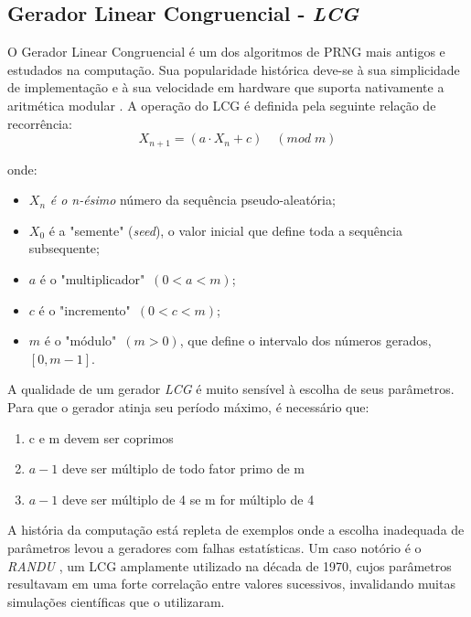 \documentclass[a4paper, 11pt]{article}
\begin{document}
\subsection{Gerador Linear Congruencial - \textit{LCG}}
\label{sub-lcg}

O Gerador Linear Congruencial é um dos algoritmos de PRNG mais antigos e estudados na computação. Sua popularidade histórica deve-se à sua simplicidade de implementação e à sua velocidade em hardware que suporta nativamente a aritmética modular \parencite{wikipedia_lcg}. A operação do LCG é definida pela seguinte relação de recorrência:
\begin{equation}
    X_{n+1} = (a \cdot X_n +c) \quad (mod \; m)
\end{equation}
\begin{flushleft}
    onde:
    \begin{itemize}
        \item \textbf{$X_n$} \textit{é o n-ésimo} número da sequência pseudo-aleatória;
        \item \textbf{$X_0$} é a "semente" (\textit{seed}), o valor inicial que define toda a sequência subsequente;
        \item \textbf{$a$} é o "multiplicador" $\,(0 < a< m)$;
        \item \textbf{$c$} é o "incremento" $\,(0 < c< m)$;
        \item \textbf{$m$} é o "módulo" $\,(m>0)$, que define o intervalo dos números gerados, $[0, m-1]$.
    \end{itemize}
\end{flushleft}

A qualidade de um gerador \textit{LCG} é muito sensível à escolha de seus parâmetros. Para que o gerador atinja seu período máximo, é necessário que:

\begin{enumerate}
    \item c e m devem ser coprimos
    \item $a-1$ deve ser múltiplo de todo fator primo de m
    \item $a-1$ deve ser múltiplo de 4 se m for múltiplo de 4
\end{enumerate}

A história da computação está repleta de exemplos onde a escolha inadequada de parâmetros levou a geradores com falhas estatísticas. Um caso notório é o \textit{RANDU} \parencite{ibm1968randu}, um LCG amplamente utilizado na década de 1970, cujos parâmetros resultavam em uma forte correlação entre valores sucessivos, invalidando muitas simulações científicas que o utilizaram. \parencite{marsaglia1968}
\end{document}
